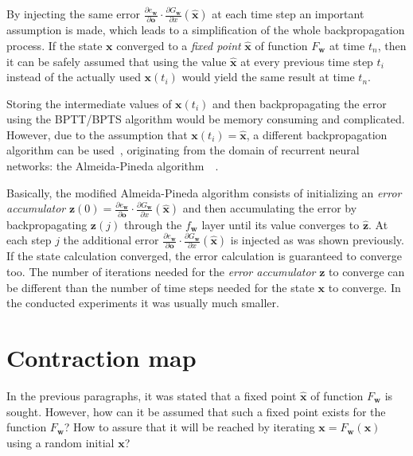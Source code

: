 By injecting the same error $\frac{\partial e_{\bm{w}}}{\partial \bm{o}}\cdot \frac{\partial G_{\bm{w}}}{\partial x}(\hat{\bm{x}})$ at each time step an important assumption is made, which leads to a simplification of the whole backpropagation process. If the state $\bm{x}$ converged to a \emph{fixed point} $\hat{\bm{x}}$ of function $F_{\bm{w}}$ at time $t_n$, then it can be safely assumed that using the value $\hat{\bm{x}}$ at every previous time step $t_i$ instead of the actually used $\bm{x}(t_i)$ would yield the same result at time $t_n$.

Storing the intermediate values of $\bm{x}(t_i)$ and then backpropagating the error using the BPTT/BPTS algorithm would be memory consuming and complicated. However, due to the assumption that $\bm{x}(t_i) = \hat{\bm{x}}$, a different backpropagation algorithm can be used~\cite{scarselli2009graph}, originating from the domain of recurrent neural networks: the Almeida-Pineda algorithm~\cite{pineda1987generalization}~\cite{williams1995gradient}.

Basically, the modified Almeida-Pineda algorithm consists of initializing an \emph{error accumulator} $\bm{z}(0) = \frac{\partial e_{\bm{w}}}{\partial \bm{o}}\cdot \frac{\partial G_{\bm{w}}}{\partial x}(\hat{\bm{x}})$ and then accumulating the error by backpropagating $\bm{z}(j)$ through the $f_{\bm{w}}$ layer until its value converges to $\hat{\bm{z}}$. At each step $j$ the additional error $\frac{\partial e_{\bm{w}}}{\partial \bm{o}}\cdot \frac{\partial G_{\bm{w}}}{\partial x}(\hat{\bm{x}})$ is injected as was shown previously. If the state calculation converged, the error calculation is guaranteed to converge too. The number of iterations needed for the \emph{error accumulator} $\bm{z}$ to converge can be different than the number of time steps needed for the state $\bm{x}$ to converge. In the conducted experiments it was usually much smaller.


\section{Contraction map\label{sec:contraction}}
In the previous paragraphs, it was stated that a fixed point $\hat{\bm{x}}$ of function $F_{\bm{w}}$ is sought. However, how can it be assumed that such a fixed point exists for the function $F_{\bm{w}}$? How to assure that it will be reached by iterating $\bm{x} = F_{\bm{w}}(\bm{x})$ using a random initial $\bm{x}$?

